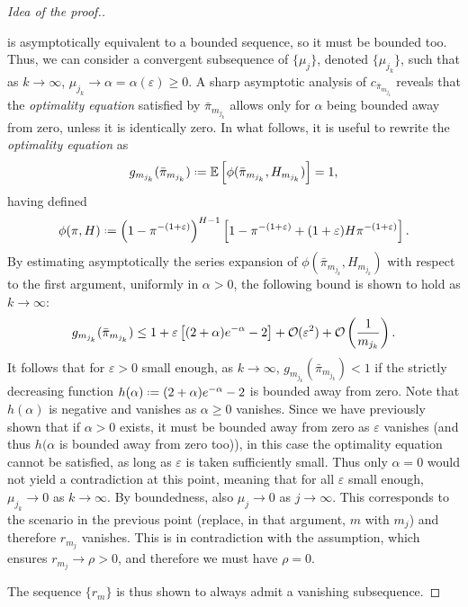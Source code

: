 \documentclass[11pt, a4paper, twoside]{article}
\DeclareRobustCommand{\bigO}{\text{\usefont{OMS}{cmsy}{m}{n}O}}
\newcommand*{\defeq}{\mathrel{\vcenter{\baselineskip0.5ex \lineskiplimit0pt
			\hbox{\scriptsize.}\hbox{\scriptsize.}}}=}
\newcommand{\eps}{\varepsilon}
\newcommand{\EE}{\mathbb{E}}
\numberwithin{equation}{section}
\begin{document}
\begin{proof}[Idea of the proof.]
\begin{itemize}[noitemsep]
			is asymptotically equivalent to a bounded sequence, so it must be bounded too. Thus, we can consider a convergent subsequence of $\{\mu_j\}$, denoted $\{\mu_{j_k}\}$, such that as $k\longrightarrow\infty$, $\mu_{j_k}\longrightarrow\alpha=\alpha(\eps)\ge0$. A sharp asymptotic analysis of $c_{\bar{\pi}_{m_{j_k}}}$ reveals that the \textit{optimality equation} satisfied by $\bar{\pi}_{m_{j_k}}$ allows only for $\alpha$ being bounded away from zero, unless it is identically zero. In what follows, it is useful to rewrite the \textit{optimality equation} as \[g_{m_{j_k}}(\bar{\pi}_{m_{j_k}})\defeq\EE\left[\phi(\bar{\pi}_{m_{j_k}},H_{m_{j_k}})\right]=1,\] having defined \[\phi(\pi,H)\defeq \left(1-\pi^{-(1+\eps)}\right)^{H-1}\left[1-\pi^{-(1+\eps)}+(1+\eps)H\pi^{-(1+\eps)}\right].\] By estimating asymptotically the series expansion of $\phi(\bar{\pi}_{m_{j_k}},H_{m_{j_k}})$ with respect to the first argument, uniformly in $\alpha>0$, the following bound is shown to hold as $k\longrightarrow\infty$: \[g_{m_{j_k}}(\bar{\pi}_{m_{j_k}})\le1+\eps\left[(2+\alpha)e^{-\alpha}-2\right]+\bigO(\eps^2)+ \bigO \left(\frac{1}{m_{j_k}}\right).\]
			It follows that for $\eps>0$ small enough, as $k\longrightarrow\infty$, $g_{m_{j_k}}(\bar{\pi}_{m_{j_k}})<1$ if the strictly decreasing function $h(\alpha)\defeq (2+\alpha)e^{-\alpha}-2$ is bounded away from zero. Note that $h(\alpha)$ is negative and vanishes as $\alpha\ge 0$ vanishes. Since we have previously shown that if $\alpha>0$ exists, it must be bounded away from zero as $\eps$ vanishes (and thus $h(\alpha$ is bounded away from zero too)), in this case the optimality equation cannot be satisfied, as long as $\eps$ is taken sufficiently small. Thus only $\alpha =0$ would not yield a contradiction at this point, meaning that for all $\eps$ small enough, $\mu_{j_k} \longrightarrow 0$ as $k\longrightarrow\infty$. By boundedness, also $\mu_j\longrightarrow 0$ as $j\longrightarrow\infty$. This corresponds to the scenario in the previous point (replace, in that argument, $m$ with $m_j$) and therefore $r_{m_j}$ vanishes. This is in contradiction with the assumption, which ensures $r_{m_j}\longrightarrow \rho>0$, and therefore we must have $\rho=0$.
		\end{itemize}
		The sequence $\{r_m\}$ is thus shown to always admit a vanishing subsequence.
	\end{proof}
	
\end{document}
